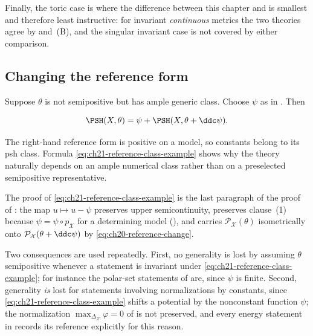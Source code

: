 \begin{example}
Finally, the toric case is where the difference between this chapter and
 is smallest and therefore least instructive: for invariant
\emph{continuous} metrics the two theories agree by
 and
\,(B), and the singular invariant case is
not covered by either comparison.
\end{example}

\subsection{Changing the reference form}
\label{sec:ch21-worked-reference}

\begin{example}
\label{ex:ch21-reference-class}
Suppose $\theta$ is not semipositive but has ample generic class.  Choose
$\psi$ as in .  Then

\begin{equation}
\label{eq:ch21-reference-class-example}
 \PSH(X,\theta)
   =\psi+\PSH(X,\theta+\ddc\psi).
\end{equation}

The right-hand reference form is positive on a model, so constants belong
to its psh class.  Formula \eqref{eq:ch21-reference-class-example} shows why
the theory naturally depends on an ample numerical class rather than on a
preselected semipositive representative.

The proof of \eqref{eq:ch21-reference-class-example} is the last paragraph
of the proof of : the map
$u\mapsto u-\psi$ preserves upper semicontinuity, preserves clause~(1)
because $\psi=\psi\circ p_{\mathcal X}$ for a determining model
(), and carries
$\mathcal P_{\mathcal X}(\theta)$ isometrically onto
$\mathcal P_{\mathcal X}(\theta+\ddc\psi)$ by
\eqref{eq:ch20-reference-change}.

Two consequences are used repeatedly.  First, no generality is lost by
assuming $\theta$ semipositive whenever a statement is invariant under
\eqref{eq:ch21-reference-class-example}; for instance the polar-set
statements of  are, since $\psi$ is
finite.  Second, generality \emph{is} lost for statements involving
normalizations by constants, since
\eqref{eq:ch21-reference-class-example} shifts a potential by the nonconstant
function $\psi$; the normalization
$\max_{\Delta_{\mathcal X}}\varphi=0$ of  is
not preserved, and every energy statement in
 records its reference explicitly for this reason.
\end{example}

